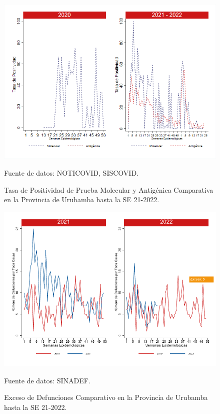 \documentclass[12pt,a4paper,openany]{book}
\begin{document}
	\begin{figure}[h]
		\caption{Tasa de Positividad de Prueba Molecular y Antigénica Comparativa en la Provincia de Urubamba hasta la SE 21-2022.}\label{fig:positividad_urub}
		\begin{center}
			\includegraphics[width=0.7\linewidth]{../figuras/positividad_20_21_13.png}
		\end{center}
		{\footnotesize {Fuente de datos: NOTICOVID, SISCOVID.}}
	\end{figure}
	
	\begin{figure}[h]
		\caption{Exceso de Defunciones Comparativo en la Provincia de Urubamba hasta la SE 21-2022.}\label{fig:exceso_urub}
		\begin{center}
			\includegraphics[width=0.7\linewidth]{../figuras/exceso_13.pdf}
		\end{center}
		{\footnotesize {Fuente de datos: SINADEF.}}
	\end{figure}
	
	\clearpage
	
	\clearpage
	
\end{document}
